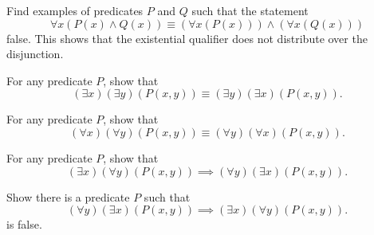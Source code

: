 \documentclass[12pt,fleqn,answers]{exam}
\begin{document}
\begin{questions}
\question Find examples of predicates $P$ and $Q$ such
that the statement
\begin{equation*}
  \forall x \left(P(x) \land Q(x) \right) \equiv
    \left(\forall x (P(x)) \right) \land 
    \left(\forall x (Q(x)) \right)
\end{equation*}
false. This shows that the existential qualifier does not 
distribute over the disjunction.

\question For any predicate $P$, show that
\begin{equation*}
  \left(\exists x\right)
  \left(\exists y \right)
  \left(P(x,y)\right) \equiv
  \left(\exists y \right)
  \left(\exists x \right)
  \left(P(x,y)\right).
\end{equation*}

\question For any predicate $P$, show that
\begin{equation*}
  \left(\forall x\right)
  \left(\forall y \right)
  \left(P(x,y)\right) \equiv
  \left(\forall y \right)
  \left(\forall x \right)
  \left(P(x,y)\right).
\end{equation*}


\question For any predicate $P$, show that
\begin{equation*}
    \left(\exists x\right)
    \left(\forall y \right)
    \left(P(x,y)\right) \implies 
    \left(\forall y \right)
    \left(\exists x \right)
    \left(P(x,y)\right).
  \end{equation*}

  \question Show there is a predicate $P$ such that 
  \begin{equation*}
    \left(\forall y \right)
    \left(\exists x \right)
    \left(P(x,y)\right) \implies 
      \left(\exists x\right)
      \left(\forall y \right)
      \left(P(x,y)\right).
\end{equation*}
is false.
  


\end{questions}
\end{document}
